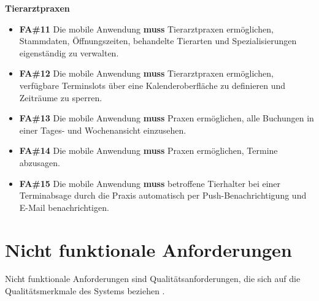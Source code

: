 \textbf{Tierarztpraxen}
\begin{itemize}
    \item \textbf{FA\#11} Die mobile Anwendung \textbf{muss} Tierarztpraxen ermöglichen, Stammdaten, Öffnungszeiten, behandelte Tierarten und Spezialisierungen eigenständig zu verwalten.

    \item \textbf{FA\#12} Die mobile Anwendung \textbf{muss} Tierarztpraxen ermöglichen, verfügbare Terminslots über eine Kalenderoberfläche zu definieren und Zeiträume zu sperren.

    \item \textbf{FA\#13} Die mobile Anwendung \textbf{muss} Praxen 
    ermöglichen, alle Buchungen in einer Tages- und 
    Wochenansicht einzusehen.

    \item \textbf{FA\#14} Die mobile Anwendung \textbf{muss} Praxen 
    ermöglichen, Termine abzusagen.

    \item \textbf{FA\#15} Die mobile Anwendung \textbf{muss} betroffene 
    Tierhalter bei einer Terminabsage durch die Praxis automatisch per 
    Push-Benachrichtigung und E-Mail benachrichtigen.
\end{itemize}

\section{Nicht funktionale Anforderungen}

Nicht funktionale Anforderungen sind Qualitätsanforderungen, die sich auf 
die Qualitätsmerkmale des Systems beziehen \cite[S.~4] {pohl2021}.


